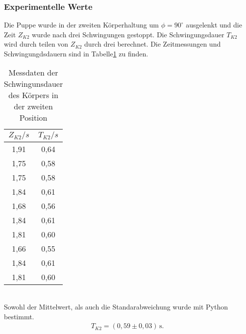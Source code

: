 \subsubsection{Experimentelle Werte}
Die Puppe wurde in der zweiten Körperhaltung um $\phi = 90^{\circ}$ ausgelenkt und die Zeit $Z_{K2}$
wurde nach drei Schwingungen gestoppt. Die Schwingungsdauer $T_{K2}$ wird durch teilen von $Z_{K2}$
durch drei berechnet. Die Zeitmessungen und Schwingungdsdauern sind in Tabelle\ref{tab:Koerper2} zu finden.
\begin{table}
  \centering
  \caption{Messdaten der Schwingunsdauer des Körpers in der zweiten Position}
  \label{tab:Koerper2}
  \begin{tabular}{c c}
    \toprule
    $Z_{K2}/s$ & $T_{K2}/s$ \\
    \midrule
    1,91 & 0,64 \\
    1,75 & 0,58 \\
    1,75 & 0,58 \\
    1,84 & 0,61 \\
    1,68 & 0,56 \\
    1,84 & 0,61 \\
    1,81 & 0,60 \\
    1,66 & 0,55 \\
    1,84 & 0,61 \\
    1,81 & 0,60 \\
    \bottomrule
  \end{tabular}
\end{table}
\\
Sowohl der Mittelwert, als auch die Standarabweichung wurde mit Python bestimmt.
\begin{align*}
  T_{K2} = (0{,}59 \pm 0{,}03)\, \mathrm{s} .
\end{align*}

